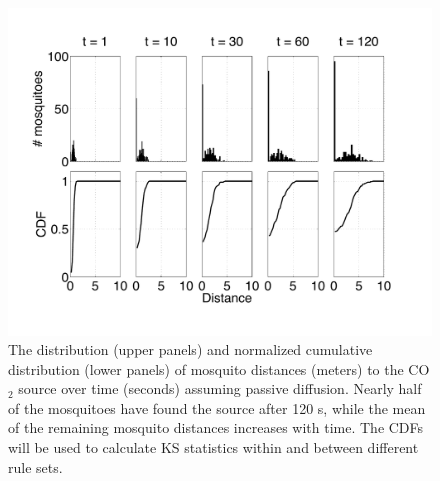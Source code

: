 \documentclass[12pt]{article}
\newcommand{\mycaption}[1]{\caption{#1}}
\begin{document}
\begin{figure}[htp]
	\begin{center}
		\includegraphics[width=6.8in]{figures/DiffusionFigure.pdf}
	\end{center}
	\mycaption{The distribution (upper panels) and normalized cumulative distribution (lower panels) of mosquito distances (meters) to the CO$_2$ source over time (seconds) assuming passive diffusion. Nearly half of the mosquitoes have found the source after 120 s, while the mean of the remaining mosquito distances increases with time. The CDFs will be used to calculate KS statistics within and between different rule sets.}\label{fig:diffhist}
\end{figure}
\end{document}
